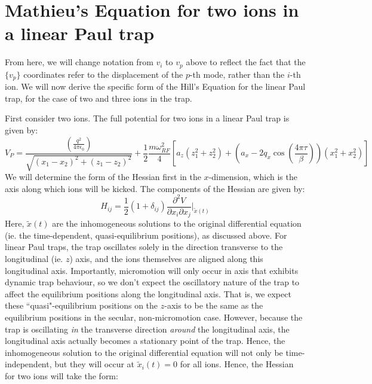 \documentclass{article}
\begin{document}
\section{Mathieu's Equation for two ions in a linear Paul trap}
From here, we will change notation from $v_i$ to $v_p$ above to reflect the fact that the $ \{ v_p \}$ coordinates refer to the displacement of the $p$-th mode, rather than the $i$-th ion. We will now derive the specific form of the Hill's Equation for the linear Paul trap, for the case of two and three ions in the trap. \par
\medskip
\noindent First consider two ions. The full potential for two ions in a linear Paul trap is given by:
\begin{equation}
	V_P = \frac{\left( \frac{q^2}{4 \pi \epsilon_0} \right)}{\sqrt{(x_1 - x_2)^2 + (z_1 - z_2)^2}}  + \frac{1}{2} \frac{m \omega_{RF}^2}{4} [ a_z (z_1^2 + z_2^2) + (a_x - 2 q_x \cos(\frac{4 \pi \tau}{\beta}) ) (x_1^2 + x_2^2) ]
\end{equation}
We will determine the form of the Hessian first in the $x$-dimension, which is the axis along which ions will be kicked. The components of the Hessian are given by:
\begin{equation}
H_{ij} = \frac{1}{2} (1 + \delta_{ij}) \frac{\partial^2 V}{\partial x_i \partial x_j } \Biggr|_{\tilde{x} (t)}
\end{equation}
Here, $\tilde{x} (t)$ are the inhomogeneous solutions to the original differential equation (ie. the time-dependent, quasi-equilibrium positions), as discussed above. For linear Paul traps, the trap oscillates solely in the direction transverse to the longitudinal (ie. $z$) axis, and the ions themselves are aligned along this longitudinal axis. Importantly, micromotion will only occur in axis that exhibits dynamic trap behaviour, so we don't expect the oscillatory nature of the trap to affect the equilibrium positions along the longitudinal axis. That is, we expect these ``quasi"-equilibrium positions on the $z$-axis to be the same as the equilibrium positions in the secular, non-micromotion case. However, because the trap is oscillating \textit{in} the transverse direction \textit{around} the longitudinal axis, the longitudinal axis actually becomes a stationary point of the trap. Hence, the inhomogeneous solution to the original differential equation will not only be time-independent, but they will occur at $\tilde{x}_i (t) = 0$ for all ions. Hence, the Hessian for two ions will take the form:
\end{document}
